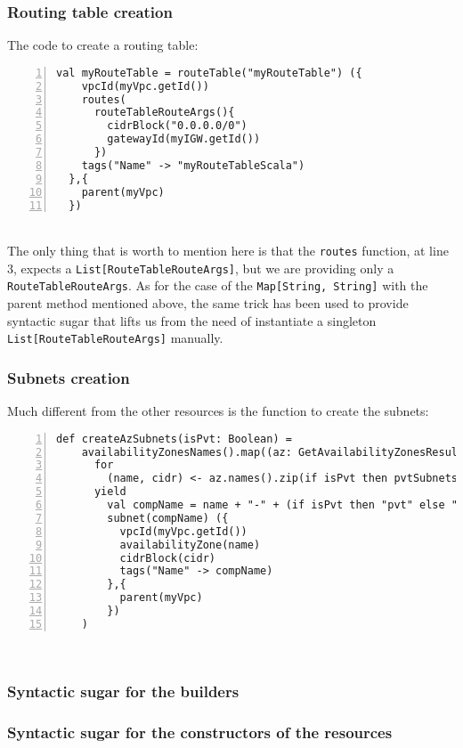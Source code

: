 \subsubsection{Routing table creation}
The code to create a routing table:
\begin{lstlisting}[numbers=left, numberstyle=\tiny, numbersep=-5pt, stepnumber=1]
  val myRouteTable = routeTable("myRouteTable") ({
    vpcId(myVpc.getId())
    routes(
      routeTableRouteArgs(){
        cidrBlock("0.0.0.0/0")
        gatewayId(myIGW.getId())
      })
    tags("Name" -> "myRouteTableScala")
  },{
    parent(myVpc)
  })
\end{lstlisting}\mbox{}\\
The only thing that is worth to mention here is that the \texttt{routes} function, at line 3, expects a \texttt{List[RouteTableRouteArgs]}, but we are providing only a \texttt{RouteTableRouteArgs}.
As for the case of the \texttt{Map[String, String]} with the parent method mentioned above, the same trick has been used to provide syntactic sugar that lifts us from the need of instantiate a singleton \texttt{List[RouteTableRouteArgs]} manually.

\subsubsection{Subnets creation}
Much different from the other resources is the function to create the subnets:
\begin{lstlisting}[numbers=left, numberstyle=\tiny, numbersep=-5pt, stepnumber=1,linewidth=420pt]
  def createAzSubnets(isPvt: Boolean) =
    availabilityZonesNames().map((az: GetAvailabilityZonesResult) =>
      for
        (name, cidr) <- az.names().zip(if isPvt then pvtSubnetsCidrs else pubSubnetsCidrs)
      yield
        val compName = name + "-" + (if isPvt then "pvt" else "pub") + "-subnet-scala"
        subnet(compName) ({
          vpcId(myVpc.getId())
          availabilityZone(name)
          cidrBlock(cidr)
          tags("Name" -> compName)
        },{
          parent(myVpc)
        })
    )
\end{lstlisting}\mbox{}\\


\subsubsection{Syntactic sugar for the builders}


\subsubsection{Syntactic sugar for the constructors of the resources}

